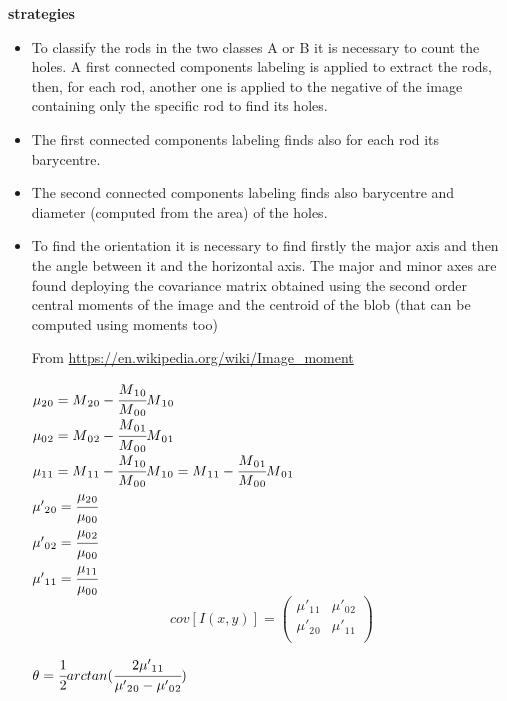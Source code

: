 \documentclass[11pt]{article}
\begin{document}
    \textbf{strategies} \\
\begin{itemize}
    \item To classify the rods in the two classes A or B it
is necessary to count the holes. A first connected components labeling
is applied to extract the rods, then, for each rod, another one is
applied to the negative of the image containing only the specific rod to
find its holes.
    \item The first connected components labeling finds also for
each rod its barycentre.
    \item The second connected components labeling
finds also barycentre and diameter (computed from the area) of the
holes. 
    \item To find the orientation it is necessary to find firstly the
major axis and then the angle between it and the horizontal axis. The
major and minor axes are found deploying the covariance matrix obtained
using the second order central moments of the image and the centroid of
the blob (that can be computed using moments too)

From \url{https://en.wikipedia.org/wiki/Image_moment}

$\mu{}_2{}_0 = M{}_2{}_0 - \cfrac{M{}_1{}_0}{M{}_0{}_0}M{}_1{}_0$ \\
$\mu{}_0{}_2 = M{}_0{}_2 - \cfrac{M{}_0{}_1}{M{}_0{}_0}M{}_0{}_1$ \\
$\mu{}_1{}_1 = M{}_1{}_1 - \cfrac{M{}_1{}_0}{M{}_0{}_0}M{}_1{}_0 = M{}_1{}_1 - \cfrac{M{}_0{}_1}{M{}_0{}_0}M{}_0{}_1$ \\  
$\mu'{}_2{}_0 = \cfrac{\mu{}_2{}_0}{\mu{}_0{}_0}$ \\
$\mu'{}_0{}_2 = \cfrac{\mu{}_0{}_2}{\mu{}_0{}_0}$ \\
$\mu'{}_1{}_1 = \cfrac{\mu{}_1{}_1}{\mu{}_0{}_0}$ \\

\begin{equation}
    cov[I(x, y)] = 
    \begin{pmatrix}
        \mu'{}_1{}_1 & \mu'{}_0{}_2 \\
        \mu'{}_2{}_0 & \mu'{}_1{}_1 \\
    \end{pmatrix}
\end{equation}
\begin{center}
    $\theta = \cfrac{1}{2}arctan(\cfrac{2\mu'{}_1{}_1}{\mu'{}_2{}_0 - \mu'{}_0{}_2})$     
\end{center}

\end{itemize}
\end{document}
